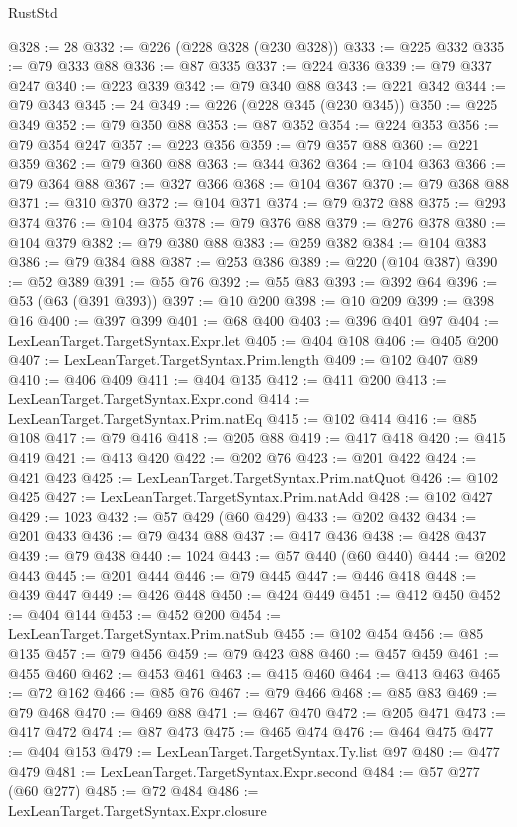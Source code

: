 \begin{lexlean}{RustStd}
\begin{coremodule}
@328 := 28
@332 := @226 (@228 @328 (@230 @328))
@333 := @225 @332
@335 := @79 @333 @88
@336 := @87 @335
@337 := @224 @336
@339 := @79 @337 @247
@340 := @223 @339
@342 := @79 @340 @88
@343 := @221 @342
@344 := @79 @343
@345 := 24
@349 := @226 (@228 @345 (@230 @345))
@350 := @225 @349
@352 := @79 @350 @88
@353 := @87 @352
@354 := @224 @353
@356 := @79 @354 @247
@357 := @223 @356
@359 := @79 @357 @88
@360 := @221 @359
@362 := @79 @360 @88
@363 := @344 @362
@364 := @104 @363
@366 := @79 @364 @88
@367 := @327 @366
@368 := @104 @367
@370 := @79 @368 @88
@371 := @310 @370
@372 := @104 @371
@374 := @79 @372 @88
@375 := @293 @374
@376 := @104 @375
@378 := @79 @376 @88
@379 := @276 @378
@380 := @104 @379
@382 := @79 @380 @88
@383 := @259 @382
@384 := @104 @383
@386 := @79 @384 @88
@387 := @253 @386
@389 := @220 (@104 @387)
@390 := @52 @389
@391 := @55 @76
@392 := @55 @83
@393 := @392 @64
@396 := @53 (@63 (@391 @393))
@397 := @10 @200
@398 := @10 @209
@399 := @398 @16
@400 := @397 @399
@401 := @68 @400
@403 := @396 @401 @97
@404 := LexLeanTarget.TargetSyntax.Expr.let
@405 := @404 @108
@406 := @405 @200
@407 := LexLeanTarget.TargetSyntax.Prim.length
@409 := @102 @407 @89
@410 := @406 @409
@411 := @404 @135
@412 := @411 @200
@413 := LexLeanTarget.TargetSyntax.Expr.cond
@414 := LexLeanTarget.TargetSyntax.Prim.natEq
@415 := @102 @414
@416 := @85 @108
@417 := @79 @416
@418 := @205 @88
@419 := @417 @418
@420 := @415 @419
@421 := @413 @420
@422 := @202 @76
@423 := @201 @422
@424 := @421 @423
@425 := LexLeanTarget.TargetSyntax.Prim.natQuot
@426 := @102 @425
@427 := LexLeanTarget.TargetSyntax.Prim.natAdd
@428 := @102 @427
@429 := 1023
@432 := @57 @429 (@60 @429)
@433 := @202 @432
@434 := @201 @433
@436 := @79 @434 @88
@437 := @417 @436
@438 := @428 @437
@439 := @79 @438
@440 := 1024
@443 := @57 @440 (@60 @440)
@444 := @202 @443
@445 := @201 @444
@446 := @79 @445
@447 := @446 @418
@448 := @439 @447
@449 := @426 @448
@450 := @424 @449
@451 := @412 @450
@452 := @404 @144
@453 := @452 @200
@454 := LexLeanTarget.TargetSyntax.Prim.natSub
@455 := @102 @454
@456 := @85 @135
@457 := @79 @456
@459 := @79 @423 @88
@460 := @457 @459
@461 := @455 @460
@462 := @453 @461
@463 := @415 @460
@464 := @413 @463
@465 := @72 @162
@466 := @85 @76
@467 := @79 @466
@468 := @85 @83
@469 := @79 @468
@470 := @469 @88
@471 := @467 @470
@472 := @205 @471
@473 := @417 @472
@474 := @87 @473
@475 := @465 @474
@476 := @464 @475
@477 := @404 @153
@479 := LexLeanTarget.TargetSyntax.Ty.list @97
@480 := @477 @479
@481 := LexLeanTarget.TargetSyntax.Expr.second
@484 := @57 @277 (@60 @277)
@485 := @72 @484
@486 := LexLeanTarget.TargetSyntax.Expr.closure

\end{coremodule}
\end{lexlean}
